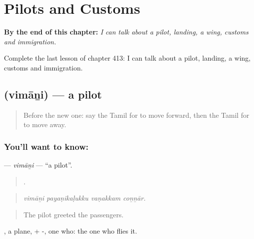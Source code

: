 
\chapter{Pilots and Customs}
\label{ch:ta-pilots-and-customs}

\begin{chapteropening}
\textbf{By the end of this chapter:} \emph{I can talk about a pilot, landing, a wing, customs and immigration.}

Complete the last lesson of chapter 413: I can talk about a pilot, landing, a wing, customs and immigration.
\end{chapteropening}

\section[\texorpdfstring{\ta{விமானி} (vimāṉi)}{விமானி (vimāṉi)}]{ (vimāṉi) — a pilot}

\label{lesson:TA-C413-vimani}



\begin{quote}
Before the new one: say the Tamil for to move forward, then the Tamil for to move away.
\end{quote}

\subsection*{You'll want to know: }
\textbf{} — \emph{vimāṉi} — \textquotedblleft{}a pilot\textquotedblright{}.

\begin{quote}
   .
\end{quote}

\begin{quote}
\emph{vimāṉi payaṇikaḷukku vaṇakkam coṉṉār.}
\end{quote}

\begin{quote}
The pilot greeted the passengers.
\end{quote}

, a plane, + -, one who: the one who flies it.

